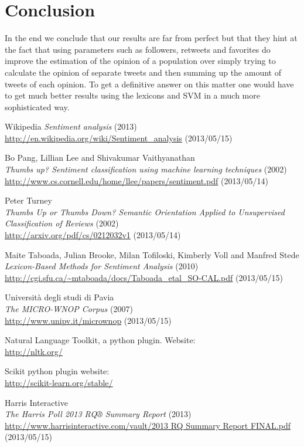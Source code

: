 \documentclass[a4paper,12pt]{report}
\begin{document}
\section{Conclusion}

In the end we conclude that our results are far from perfect but that they hint at the fact that using parameters such as followers, retweets and favorites do improve the estimation of the opinion of a population over simply trying to calculate the opinion of separate tweets and then summing up the amount of tweets of each opinion.
To get a definitive answer on this matter one would have to get much better results using the lexicons and SVM in a much more sophisticated way.

\begin{thebibliography}{9}


  Wikipedia
  \emph{Sentiment analysis} (2013)
  \url{http://en.wikipedia.org/wiki/Sentiment_analysis} (2013/05/15)

  Bo Pang, Lillian Lee and Shivakumar Vaithyanathan\\
  \emph{Thumbs up? Sentiment classification using machine learning techniques} (2002)\\
  \url{http://www.cs.cornell.edu/home/llee/papers/sentiment.pdf} (2013/05/14)

  Peter Turney\\
  \emph{Thumbs Up or Thumbs Down? Semantic Orientation Applied to Unsupervised Classification of Reviews} (2002)\\
  \url{http://arxiv.org/pdf/cs/0212032v1} (2013/05/14)

  Maite Taboada, Julian Brooke, Milan Tofiloski, Kimberly Voll and Manfred Stede\\
  \emph{Lexicon-Based Methods for Sentiment Analysis} (2010)\\
  \url{http://cgi.sfu.ca/~mtaboada/docs/Taboada_etal_SO-CAL.pdf} (2013/05/15)

  Università degli studi di Pavia\\
  \emph{The MICRO-WNOP Corpus} (2007)\\
  \url{http://www.unipv.it/micrownop} (2013/05/15)
  
  Natural Language Toolkit, a python plugin. Website:\\
  \url{http://nltk.org/}
  
  Scikit python plugin website:\\
  \url{http://scikit-learn.org/stable/}

  Harris Interactive\\
  \emph{The Harris Poll 2013 RQ® Summary Report} (2013)\\
  \url{http://www.harrisinteractive.com/vault/2013 RQ Summary Report FINAL.pdf} (2013/05/15)

\end{thebibliography}
\end{document}
